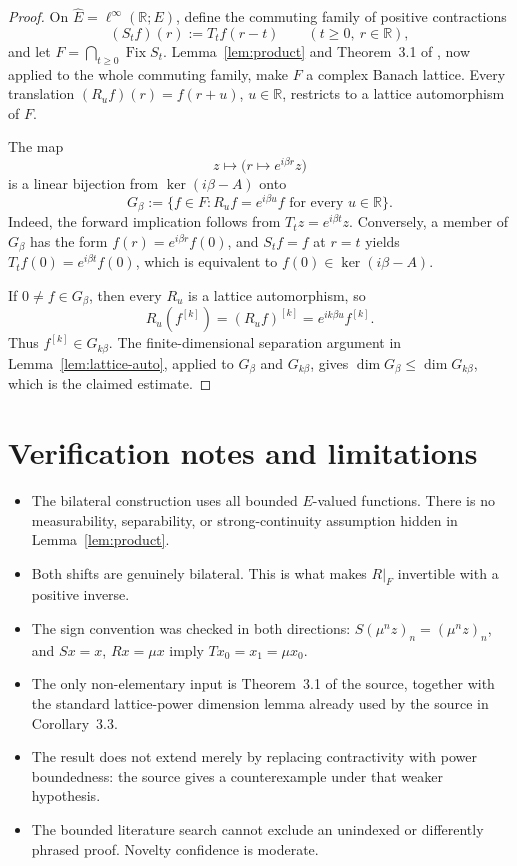 \documentclass[11pt]{article}
\newcommand{\Fix}{\operatorname{Fix}}
\begin{document}
\begin{proof}
On \(\widehat E=\ell^\infty(\mathbb R;E)\), define the commuting family of
positive contractions
\[
 (S_t f)(r):=T_t f(r-t)\qquad(t\geq0,\ r\in\mathbb R),
\]
and let \(F=\bigcap_{t\geq0}\Fix S_t\).  Lemma~\ref{lem:product} and
Theorem~3.1 of \cite{GlueckFixed}, now applied to the whole commuting family,
make \(F\) a complex Banach lattice.  Every translation
\((R_u f)(r)=f(r+u)\), \(u\in\mathbb R\), restricts to a lattice
automorphism of \(F\).

The map
\[
 z\longmapsto \bigl(r\mapsto e^{i\beta r}z\bigr)
\]
is a linear bijection from \(\ker(i\beta-A)\) onto
\[
 G_\beta
 :=\{f\in F:R_u f=e^{i\beta u}f\text{ for every }u\in\mathbb R\}.
\]
Indeed, the forward implication follows from
\(T_tz=e^{i\beta t}z\).  Conversely, a member of \(G_\beta\) has the form
\(f(r)=e^{i\beta r}f(0)\), and \(S_t f=f\) at \(r=t\) yields
\(T_t f(0)=e^{i\beta t}f(0)\), which is equivalent to
\(f(0)\in\ker(i\beta-A)\).

If \(0\neq f\in G_\beta\), then every \(R_u\) is a lattice automorphism, so
\[
 R_u(f^{[k]})
 =(R_u f)^{[k]}
 =e^{ik\beta u}f^{[k]}.
\]
Thus \(f^{[k]}\in G_{k\beta}\).  The finite-dimensional separation argument
in Lemma~\ref{lem:lattice-auto}, applied to \(G_\beta\) and \(G_{k\beta}\),
gives \(\dim G_\beta\leq\dim G_{k\beta}\), which is the claimed estimate.
\end{proof}

\section*{Verification notes and limitations}

\begin{itemize}[leftmargin=*]
\item The bilateral construction uses all bounded \(E\)-valued functions.
      There is no measurability, separability, or strong-continuity assumption
      hidden in Lemma~\ref{lem:product}.
\item Both shifts are genuinely bilateral.  This is what makes \(R|_F\)
      invertible with a positive inverse.
\item The sign convention was checked in both directions:
      \(S(\mu^n z)_n=(\mu^n z)_n\), and \(Sx=x\), \(Rx=\mu x\) imply
      \(Tx_0=x_1=\mu x_0\).
\item The only non-elementary input is Theorem~3.1 of the source, together
      with the standard lattice-power dimension lemma already used by the
      source in Corollary~3.3.
\item The result does not extend merely by replacing contractivity with
      power boundedness: the source gives a counterexample under that weaker
      hypothesis.
\item The bounded literature search cannot exclude an unindexed or
      differently phrased proof.  Novelty confidence is moderate.
\end{itemize}
\end{document}
